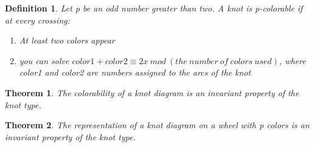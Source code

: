 \documentclass[executivepaper]{article}
\newtheorem{definition}{Definition}
\newtheorem{theorem}{Theorem}
\begin{document}
\begin{tcolorbox}

\begin{definition}

\textit{Let p be an odd number greater than two. A knot is p-colorable if at every crossing:}

\begin{center}

\begin{enumerate}

\item At least two colors appear

\item you can solve $color1 + color2 \equiv 2x ~ mod ~ (the ~ number ~ of ~ colors ~ used)$, where color1 and color2 are numbers assigned to the arcs of the knot

\end{enumerate}

\end{center}

\end{definition}

\end{tcolorbox}

\vspace{2mm}

\begin{tcolorbox}

\begin{theorem}

\textit{The colorability of a knot diagram is an invariant property of the knot type.}

\end{theorem}

\end{tcolorbox}

\vspace{2mm}

\begin{tcolorbox}

\begin{theorem}

\textit{The representation of a knot diagram on a wheel with p colors is an invariant property of the knot type.}

\end{theorem}

\end{tcolorbox}

\vspace{2mm}
\end{document}
